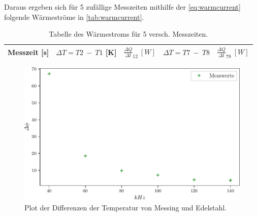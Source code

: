 Daraus ergeben sich für 5 zufällige Messzeiten mithilfe der \autoref{eq:warmcurrent} folgende Wärmeströme in \autoref{tab:warmcurrent}.

\begin{table}
    \centering
    \caption{Tabelle des Wärmestroms für 5 versch. Messzeiten.}
    \begin{tabular}{c|c|c|c|c}
        \toprule
        Messzeit [s] & $\Delta T = T2\ -\ T1$ [K] & $\frac{\Delta Q}{\Delta t}_{12}\ [W]$ & $\Delta T = T7\ -\ T8$ & $\frac{\Delta Q}{\Delta t}_{78}\ [W]$\\
        \midrule

    \end{tabular}
\end{table}

\begin{figure}
    \centering
    \includegraphics{build/plot3.pdf}
    \caption{Plot der Differenzen der Temperatur von Messing und Edelstahl.}
    \label{fig:deltaT}
\end{figure}